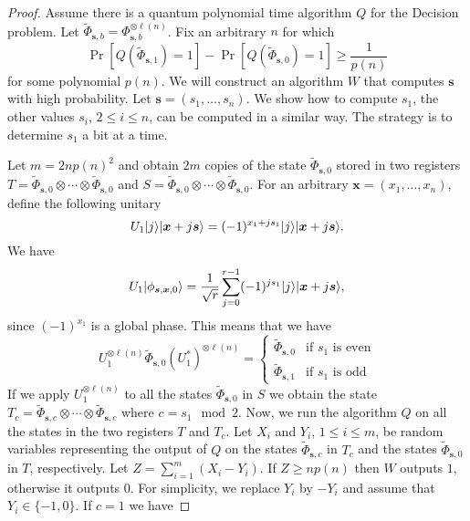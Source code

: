 \documentclass[11pt]{article}
\theoremstyle{plain}
\theoremstyle{definition}
\DeclarePairedDelimiter{\ldbrac}{\lvert}{\rangle}
\begin{document}
\begin{proof}
    Assume there is a quantum polynomial time algorithm $Q$ for the Decision problem. Let $\tilde{\Phi}_{\bm{s}, b} = \Phi_{\bm{s}, b}^{\otimes \ell(n)}$. Fix an arbitrary $n$ for which 
    \[ \Pr[ Q(\tilde{\Phi}_{\bm{s}, 1}) = 1 ] - \Pr[ Q(\tilde{\Phi}_{\bm{s}, 0}) = 1 ] \ge \frac{1}{p(n)} \]
    for some polynomial $p(n)$. We will construct an algorithm $W$ that computes $\bm{s}$ with high probability. Let $\bm{s} = (s_1, \dots, s_n)$. We show how to compute $s_1$, the other values $s_i$, $2 \le i \le n$, can be computed in a similar way. The strategy is to determine $s_1$ a bit at a time.

    Let $m = 2np(n)^2$ and obtain $2m$ copies of the state $\tilde{\Phi}_{\bm{s}, 0}$ stored in two registers $T = \tilde{\Phi}_{\bm{s}, 0} \otimes \cdots \otimes \tilde{\Phi}_{\bm{s}, 0}$ and $S = \tilde{\Phi}_{\bm{s}, 0} \otimes \cdots \otimes \tilde{\Phi}_{\bm{s}, 0}$. For an arbitrary $\bm{x} = (x_1, \dots, x_n)$, define the following unitary
    \[ U_1 \ldbrac{j}\ldbrac{\bm{x} + j\bm{s}} = (-1)^{x_1 + js_1} \ldbrac{j}\ldbrac{\bm{x} + j\bm{s}}. \]
    We have
    \[ U_1 \ldbrac{\phi_{\bm{s}, \bm{x}, 0}} = \frac{1}{\sqrt{r}} \sum_{j = 0}^{r - 1} (-1)^{js_1}\ldbrac{j}\ldbrac{\bm{x} + j\bm{s}}, \]
    since $(-1)^{x_1}$ is a global phase. This means that we have
    \begin{equation}
        \label{equ:u1}
        U_1^{\otimes \ell(n)} \tilde{\Phi}_{\bm{s}, 0} (U_1^*)^{\otimes \ell(n)} =
        \begin{cases}
            \tilde{\Phi}_{\bm{s}, 0} & \text{if } s_1 \text{ is even} \\
            \tilde{\Phi}_{\bm{s}, 1} & \text{if } s_1 \text{ is odd}
        \end{cases}
    \end{equation}
    If we apply $U_1^{\otimes \ell(n)}$ to all the states $\tilde{\Phi}_{\bm{s}, 0}$ in $S$ we obtain the state $T_c = \tilde{\Phi}_{\bm{s}, c} \otimes \cdots \otimes \tilde{\Phi}_{\bm{s}, c}$ where $c = s_1 \mod 2$. Now, we run the algorithm $Q$ on all the states in the two registers $T$ and $T_c$. Let $X_i$ and $Y_i$, $1 \le i \le m$, be random variables representing the output of $Q$ on the states $\tilde{\Phi}_{\bm{s}, c}$ in $T_c$ and the states $\tilde{\Phi}_{\bm{s}, 0}$ in $T$, respectively. Let $Z = \sum_{i = 1}^m (X_i - Y_i)$. If $Z \ge np(n)$ then $W$ outputs $1$, otherwise it outputs $0$. For simplicity, we replace $Y_i$ by $-Y_i$ and assume that $Y_i \in \{ -1, 0 \}$. If $c = 1$ we have

\end{proof}
\end{document}
